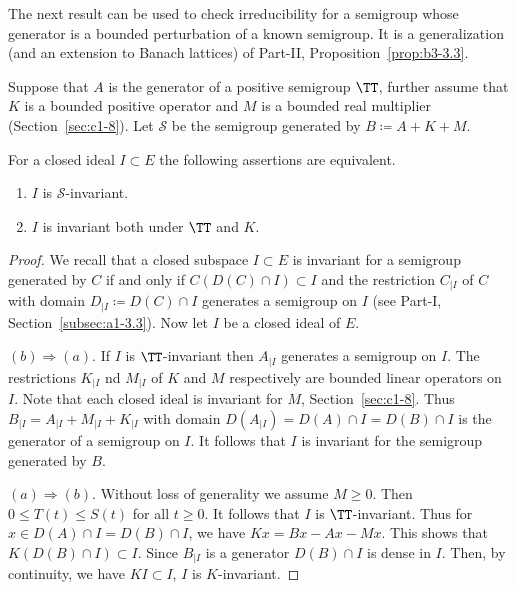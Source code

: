 The next result can be used to check irreducibility for a semigroup whose generator is a bounded perturbation of a known semigroup. It is a generalization (and an extension to Banach lattices) of Part-II, Proposition~\ref{prop:b3-3.3}. 

\begin{proposition}\label{prop:c3-3.3}
	Suppose that $A$ is the generator of a positive semigroup $\TT$, further assume that $K$ is a bounded positive operator and $M$ is a bounded real multiplier (\cf Section~\ref{sec:c1-8}).
	Let $\mathcal{S}$ be the semigroup generated by $B \coloneqq A + K + M$.
	
	For a closed ideal $I \subset E$ the following assertions are equivalent.
	\begin{enumerate}[\upshape (a)]
		\item 
		$I$ is $\mathcal{S}$-invariant.
	
		\item 
		$I$ is invariant both under $\TT$ and $K$.
	\end{enumerate}
\end{proposition}
\begin{proof}
We recall that a closed subspace $I \subset E$ is invariant for a semigroup generated by $C$ if and only if\/ $C(D(C)\cap I) \subset I$ and the restriction $C_{|I}$ of\/ $C$ with domain $D_{|I} \coloneqq D(C)\cap I$ generates a semigroup on $I$ (see Part-I, Section~\ref{subsec:a1-3.3}).
Now let $I$ be a closed ideal of\/ $E$.

$(b)\Rightarrow (a)$.
If\/ $I$ is $\TT$-invariant then $A_{|I}$ generates a semigroup on $I$.
The restrictions $K_{|I}$ nd $M_{|I}$ of\/ $K$ and $M$ respectively are bounded linear operators on $I$.
Note that each closed ideal is invariant for $M$, \cf Section~\ref{sec:c1-8}.
Thus $B_{|I} = A_{|I} + M_{|I} + K_{|I}$ with domain $D(A_{|I}) = D(A)\cap I = D(B)\cap I$ is the generator of a semigroup on $I$.
It follows that $I$ is invariant for the semigroup generated by $B$.

$(a) \Rightarrow (b)$.
Without loss of generality we assume $M \geq 0$.
Then $0 \leq T(t) \leq S(t)$ for all $t \geq 0$.
It follows that $I$ is $\TT$-invariant.
Thus for $x \in D(A)\cap I = D(B)\cap I$, we have $Kx = Bx - Ax - Mx$.
This shows that $K(D(B)\cap I) \subset I$.
Since $B_{\vert I}$ is a generator $D(B)\cap I$ is dense in $I$.
Then, by continuity, we have $KI \subset I$, \ie  $I$ is $K$-invariant.
\end{proof}

